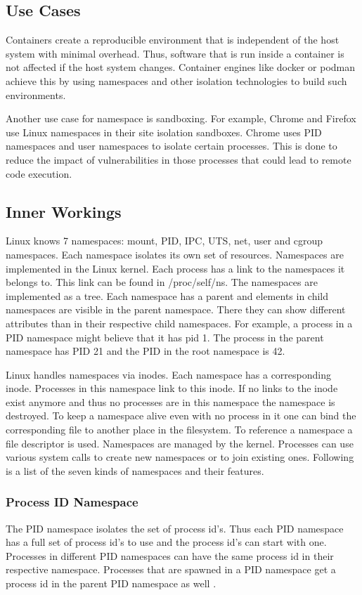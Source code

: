 \documentclass[10pt,twocolumn,a4paper]{article}
\begin{document}
\subsection{Use Cases}
Containers create a reproducible environment that is independent of the host system with minimal overhead.
Thus, software that is run inside a container is not affected if the host system changes. 
Container engines like docker or podman achieve this by using namespaces and other isolation
technologies to build such environments.


Another use case for namespace is sandboxing. For example, Chrome and Firefox use Linux namespaces
in their site isolation sandboxes. 
Chrome uses PID namespaces and user namespaces to isolate certain processes.
This is done to reduce the impact of vulnerabilities in those processes that could lead to remote code execution.


\subsection{Inner Workings}
Linux knows 7 namespaces: mount, PID, IPC, UTS, net, user and cgroup namespaces. Each namespace isolates its own set of resources. Namespaces are implemented in the Linux kernel.
Each process has a link to the namespaces it belongs to. This link can be found in /proc/self/ns\cite{8}.
The namespaces are implemented as a tree.
Each namespace has a parent and elements in child namespaces are visible in the parent namespace.
There they can show different attributes than in their respective child namespaces. 
For example, a process in a PID namespace might believe that it has pid 1.
The process in the parent namespace has PID  21 and the PID in the root namespace is 42.

Linux handles namespaces via inodes. Each namespace has a corresponding inode.
Processes in this namespace link to this inode. 
If no links to the inode exist anymore and thus no processes are in
this namespace the namespace is destroyed. 
To keep a namespace alive even with no process in it one can bind 
the corresponding file to another place in the filesystem.
To reference a namespace a file descriptor is used.
Namespaces are managed by the kernel.
 Processes can use various system calls to create new namespaces or to join existing ones.\cite{8}
Following is a list of the seven kinds of namespaces and their features.


\subsubsection{Process ID Namespace}
The PID namespace isolates the set of process id's. 
Thus each PID namespace has a full set of process id's to use and  the process id's can start with one.
Processes in different PID namespaces can have the same process id in their respective namespace. 
Processes that are spawned in a PID namespace get a process id in the parent PID namespace as well 
\cite{11}.
\end{document}
